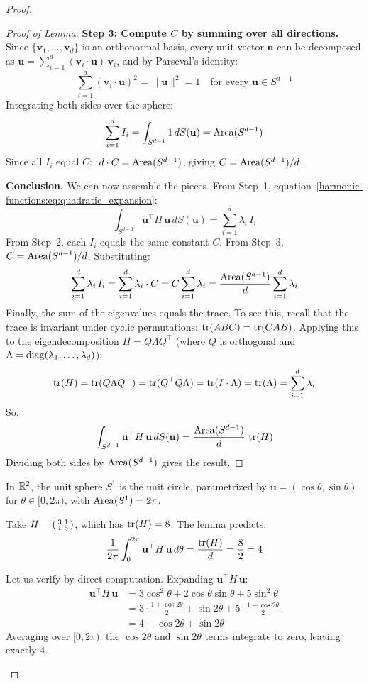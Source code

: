\begin{notechapter}
\begin{proof}
\begin{proof}[Proof of Lemma]
\textbf{Step 3: Compute $C$ by summing over all directions.} Since
$\{\mathbf{v}_1, \ldots, \mathbf{v}_d\}$ is an orthonormal basis, every
unit vector $\mathbf{u}$ can be decomposed as
$\mathbf{u} = \sum_{i=1}^d (\mathbf{v}_i \cdot \mathbf{u})\,\mathbf{v}_i$,
and by Parseval's identity:
\[
\sum_{i=1}^d (\mathbf{v}_i \cdot \mathbf{u})^2 = \|\mathbf{u}\|^2 = 1
\quad\text{for every } \mathbf{u} \in S^{d-1}
\]
Integrating both sides over the sphere:
\[
\sum_{i=1}^d I_i = \int_{S^{d-1}} 1\,dS(\mathbf{u}) = \operatorname{Area}(S^{d-1})
\]
Since all $I_i$ equal $C$: $\;d \cdot C = \operatorname{Area}(S^{d-1})$, giving
$C = \operatorname{Area}(S^{d-1})/d$.

\textbf{Conclusion.} We can now assemble the pieces. From
Step~1, equation~\eqref{harmonic-functions:eq:quadratic_expansion}:
\[
\int_{S^{d-1}} \mathbf{u}^\top H\,\mathbf{u}\,dS(\mathbf{u})
= \sum_{i=1}^d \lambda_i\, I_i
\]
From Step~2, each $I_i$ equals the same constant $C$. From Step~3,
$C = \operatorname{Area}(S^{d-1})/d$. Substituting:
\[
\sum_{i=1}^d \lambda_i\, I_i
= \sum_{i=1}^d \lambda_i \cdot C
= C \sum_{i=1}^d \lambda_i
= \frac{\operatorname{Area}(S^{d-1})}{d}\sum_{i=1}^d \lambda_i
\]
Finally, the sum of the eigenvalues equals the trace. To see this, recall
that the trace is invariant under cyclic permutations:
$\operatorname{tr}(ABC) = \operatorname{tr}(CAB)$. Applying this to the eigendecomposition
$H = Q\Lambda Q^\top$ (where $Q$ is orthogonal and $\Lambda = \operatorname{diag}(\lambda_1, \ldots, \lambda_d)$):
\[
\operatorname{tr}(H) = \operatorname{tr}(Q\Lambda Q^\top) = \operatorname{tr}(Q^\top Q\Lambda)
= \operatorname{tr}(I \cdot \Lambda) = \operatorname{tr}(\Lambda) = \sum_{i=1}^d \lambda_i
\]
So:
\[
\int_{S^{d-1}} \mathbf{u}^\top H\,\mathbf{u}\,dS(\mathbf{u})
= \frac{\operatorname{Area}(S^{d-1})}{d}\,\operatorname{tr}(H)
\]
Dividing both sides by $\operatorname{Area}(S^{d-1})$ gives the result.
\end{proof}

\begin{examplebox}[title=Verifying the Lemma in 2D]
In $\mathbb{R}^2$, the unit sphere $S^1$ is the unit circle, parametrized by
$\mathbf{u} = (\cos\theta, \sin\theta)$ for $\theta \in [0, 2\pi)$, with
$\operatorname{Area}(S^1) = 2\pi$.

Take $H = \begin{psmallmatrix} 3 & 1 \\ 1 & 5 \end{psmallmatrix}$, which
has $\operatorname{tr}(H) = 8$. The lemma predicts:
\[
\frac{1}{2\pi}\int_0^{2\pi}
  \mathbf{u}^\top H\,\mathbf{u}\,d\theta
= \frac{\operatorname{tr}(H)}{d} = \frac{8}{2} = 4
\]

Let us verify by direct computation. Expanding
$\mathbf{u}^\top H\,\mathbf{u}$:
\begin{align}
\mathbf{u}^\top H\,\mathbf{u}
&= 3\cos^2\theta + 2\cos\theta\sin\theta + 5\sin^2\theta \\
&= 3\cdot\tfrac{1+\cos 2\theta}{2}
 + \sin 2\theta
 + 5\cdot\tfrac{1-\cos 2\theta}{2} \\
&= 4 - \cos 2\theta + \sin 2\theta
\end{align}
Averaging over $[0, 2\pi)$: the $\cos 2\theta$ and $\sin 2\theta$ terms
integrate to zero, leaving exactly $4$. \checkmark


\end{examplebox}
\end{proof}
\end{notechapter}

